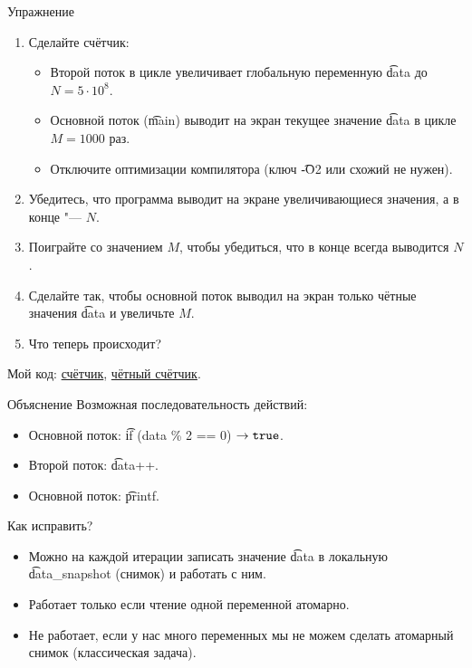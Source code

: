 \begin{frame}{Упражнение}
	\begin{enumerate}
		\item Сделайте счётчик:
			\begin{itemize}
				\item Второй поток в цикле увеличивает глобальную переменную \t{data} до $N = 5 \cdot 10^8$.
				\item Основной поток (\t{main}) выводит на экран текущее значение \t{data} в цикле $M = 1000$ раз.
				\item Отключите оптимизации компилятора (ключ \t{-O2} или схожий не нужен).
			\end{itemize}
		\item Убедитесь, что программа выводит на экране увеличивающиеся значения, а в конце "--- $N$.
		\item Поиграйте со значением $M$, чтобы убедиться, что в конце всегда выводится $N$.
		\item Сделайте так, чтобы основной поток выводил на экран только чётные значения \t{data} и увеличьте $M$.
		\item Что теперь происходит?
	\end{enumerate}
	Мой код:
	\href{https://github.com/yeputons/fall-2017-paradigms/raw/master/171023/sources/05-counter.cpp}{счётчик},
	\href{https://github.com/yeputons/fall-2017-paradigms/raw/master/171023/sources/06-even-counter.cpp}{чётный счётчик}.
\end{frame}

\begin{frame}{Объяснение}
	Возможная последовательность действий:
	\begin{itemize}
		\item Основной поток: \t{if (data \% 2 == 0)} $\to \t{true}$.
		\item Второй поток: \t{data++}.
		\item Основной поток: \t{printf}.
	\end{itemize}
	Как исправить?
	\pause
	\begin{itemize}
		\item Можно на каждой итерации записать значение \t{data} в локальную \t{data\_snapshot} (снимок) и работать с ним.
		\item Работает только если чтение одной переменной атомарно.
		\item Не работает, если у нас много переменных мы не можем сделать атомарный снимок (классическая задача).
	\end{itemize}
\end{frame}


